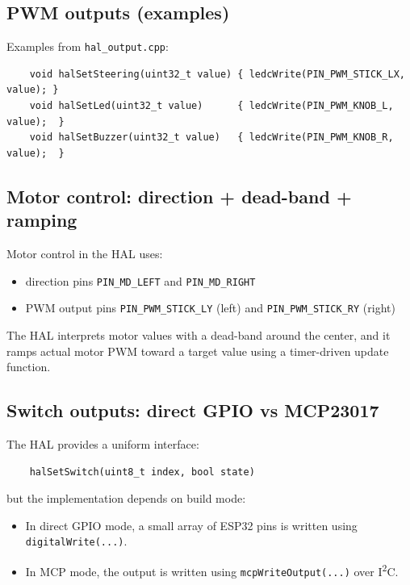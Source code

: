 \subsection{PWM outputs (examples)}
\label{subsec:control-hal-hal-pwm}

Examples from \texttt{hal\_output.cpp}:

\begin{verbatim}
    void halSetSteering(uint32_t value) { ledcWrite(PIN_PWM_STICK_LX, value); }
    void halSetLed(uint32_t value)      { ledcWrite(PIN_PWM_KNOB_L, value);  }
    void halSetBuzzer(uint32_t value)   { ledcWrite(PIN_PWM_KNOB_R, value);  }
\end{verbatim}

\subsection{Motor control: direction + dead-band + ramping}
\label{subsec:control-hal-hal-motors}

Motor control in the HAL uses:

\begin{itemize}
    \item direction pins \texttt{PIN\_MD\_LEFT} and \texttt{PIN\_MD\_RIGHT}
    \item PWM output pins \texttt{PIN\_PWM\_STICK\_LY} (left) and \texttt{PIN\_PWM\_STICK\_RY} (right)
\end{itemize}

The HAL interprets motor values with a dead-band around the center, and it ramps actual motor PWM
toward a target value using a timer-driven update function.

\subsection{Switch outputs: direct GPIO vs MCP23017}
\label{subsec:control-hal-hal-switches}

The HAL provides a uniform interface:

\begin{verbatim}
    halSetSwitch(uint8_t index, bool state)
\end{verbatim}

but the implementation depends on build mode:

\begin{itemize}
    \item In direct GPIO mode, a small array of ESP32 pins is written using \texttt{digitalWrite(...)}.
    \item In MCP mode, the output is written using \texttt{mcpWriteOutput(...)} over I\textsuperscript{2}C.
\end{itemize}


